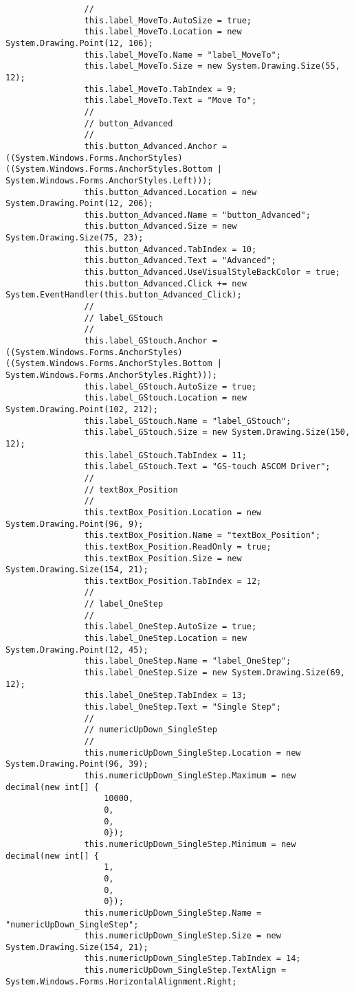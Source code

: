 \begin{lstlisting}
				// 
				this.label_MoveTo.AutoSize = true;
				this.label_MoveTo.Location = new System.Drawing.Point(12, 106);
				this.label_MoveTo.Name = "label_MoveTo";
				this.label_MoveTo.Size = new System.Drawing.Size(55, 12);
				this.label_MoveTo.TabIndex = 9;
				this.label_MoveTo.Text = "Move To";
				// 
				// button_Advanced
				// 
				this.button_Advanced.Anchor = ((System.Windows.Forms.AnchorStyles)((System.Windows.Forms.AnchorStyles.Bottom | System.Windows.Forms.AnchorStyles.Left)));
				this.button_Advanced.Location = new System.Drawing.Point(12, 206);
				this.button_Advanced.Name = "button_Advanced";
				this.button_Advanced.Size = new System.Drawing.Size(75, 23);
				this.button_Advanced.TabIndex = 10;
				this.button_Advanced.Text = "Advanced";
				this.button_Advanced.UseVisualStyleBackColor = true;
				this.button_Advanced.Click += new System.EventHandler(this.button_Advanced_Click);
				// 
				// label_GStouch
				// 
				this.label_GStouch.Anchor = ((System.Windows.Forms.AnchorStyles)((System.Windows.Forms.AnchorStyles.Bottom | System.Windows.Forms.AnchorStyles.Right)));
				this.label_GStouch.AutoSize = true;
				this.label_GStouch.Location = new System.Drawing.Point(102, 212);
				this.label_GStouch.Name = "label_GStouch";
				this.label_GStouch.Size = new System.Drawing.Size(150, 12);
				this.label_GStouch.TabIndex = 11;
				this.label_GStouch.Text = "GS-touch ASCOM Driver";
				// 
				// textBox_Position
				// 
				this.textBox_Position.Location = new System.Drawing.Point(96, 9);
				this.textBox_Position.Name = "textBox_Position";
				this.textBox_Position.ReadOnly = true;
				this.textBox_Position.Size = new System.Drawing.Size(154, 21);
				this.textBox_Position.TabIndex = 12;
				// 
				// label_OneStep
				// 
				this.label_OneStep.AutoSize = true;
				this.label_OneStep.Location = new System.Drawing.Point(12, 45);
				this.label_OneStep.Name = "label_OneStep";
				this.label_OneStep.Size = new System.Drawing.Size(69, 12);
				this.label_OneStep.TabIndex = 13;
				this.label_OneStep.Text = "Single Step";
				// 
				// numericUpDown_SingleStep
				// 
				this.numericUpDown_SingleStep.Location = new System.Drawing.Point(96, 39);
				this.numericUpDown_SingleStep.Maximum = new decimal(new int[] {
					10000,
					0,
					0,
					0});
				this.numericUpDown_SingleStep.Minimum = new decimal(new int[] {
					1,
					0,
					0,
					0});
				this.numericUpDown_SingleStep.Name = "numericUpDown_SingleStep";
				this.numericUpDown_SingleStep.Size = new System.Drawing.Size(154, 21);
				this.numericUpDown_SingleStep.TabIndex = 14;
				this.numericUpDown_SingleStep.TextAlign = System.Windows.Forms.HorizontalAlignment.Right;

\end{lstlisting}
